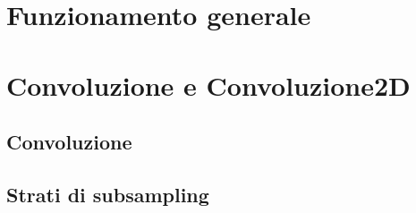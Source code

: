 \section{Funzionamento generale}
\section{Convoluzione e Convoluzione2D}
\subsection{Convoluzione}

\subsection{Strati di subsampling}

